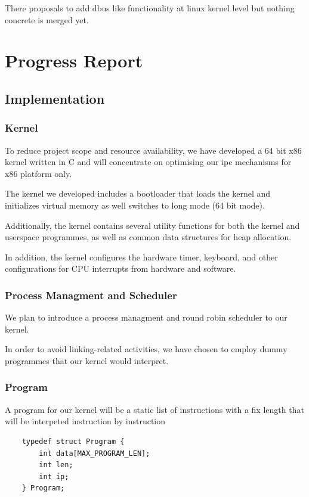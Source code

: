 \documentclass[12pt]{report}
\begin{document}
	There proposals to add dbus like functionality at linux kernel level but nothing
	concrete is merged yet\cite{citation03}.	
	
    \chapter{Progress Report}
	
	\section{Implementation}
	
	\subsection{Kernel}
	To reduce project scope and resource availability, 
	we have developed a 64 bit x86 kernel written in C and will concentrate 
	on optimising our ipc mechanisms for x86 platform only.
	
	The kernel we developed includes a bootloader that loads the kernel and initializes virtual memory
	as well switches to long mode (64 bit mode).
	
	Additionally, the kernel contains several utility functions for both the kernel and userspace programmes, 
	as well as common data structures for heap allocation. 
	
	In addition, the kernel configures the hardware timer, keyboard, and other configurations for CPU interrupts 
	from hardware and software.
	
	\subsection{Process Managment and Scheduler}
	We plan to introduce a process managment and round robin scheduler
	to our kernel.
	
	In order to avoid linking-related activities, we have chosen to employ dummy programmes that 
	our kernel would interpret.
	
	\subsection{Program}
	A program for our kernel will be a static list of instructions with a fix length
	that will be interpeted instruction by instruction
	
	\begin{verbatim}
	typedef struct Program {
    	int data[MAX_PROGRAM_LEN];
    	int len;
    	int ip;
	} Program;
	\end{verbatim}
	
\end{document}
